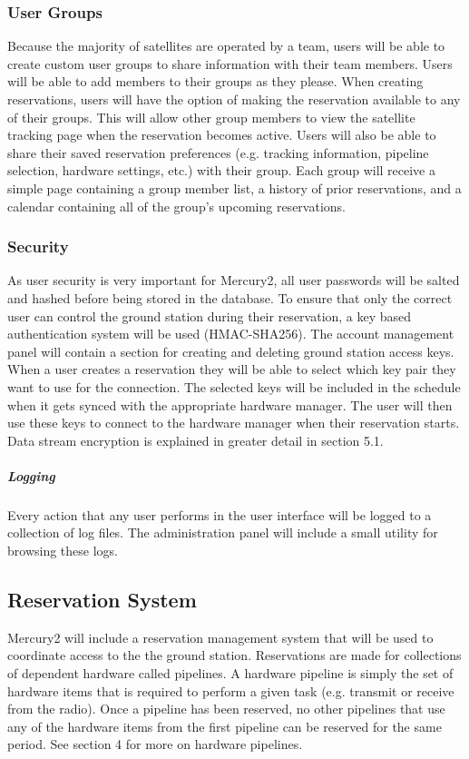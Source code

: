 \documentclass{mxl-design}
\begin{document}
\subsubsection{User Groups}
Because the majority of satellites are operated by a team, users will be able to create custom user groups to share information with their team members. Users will be able to add members to their groups as they please. When creating reservations, users will have the option of making the reservation available to any of their groups. This will allow other group members to view the satellite tracking page when the reservation becomes active. Users will also be able to share their saved reservation preferences (e.g. tracking information, pipeline selection, hardware settings, etc.) with their group. Each group will receive a simple page containing a group member list, a history of prior reservations, and a calendar containing all of the group's upcoming reservations.

\subsubsection{Security}
As user security is very important for Mercury2, all user passwords will be salted and hashed before being stored in the database. To ensure that only the correct user can control the ground station during their reservation, a key based authentication system will be used (HMAC-SHA256). The account management panel will contain a section for creating and deleting ground station access keys. When a user creates a reservation they will be able to select which key pair they want to use for the connection. The selected keys will be included in the schedule when it gets synced with the appropriate hardware manager. The user will then use these keys to connect to the hardware manager when their reservation starts. Data stream encryption is explained in greater detail in section 5.1.

\subparagraph{Logging}
Every action that any user performs in the user interface will be logged to a collection of log files. The administration panel will include a small utility for browsing these logs. 

\subsection{Reservation System}
Mercury2 will include a reservation management system that will be used to coordinate access to the the ground station. Reservations are made for collections of dependent hardware called pipelines. A hardware pipeline is simply the set of hardware items that is required to perform a given task (e.g. transmit or receive from the radio). Once a pipeline has been reserved, no other pipelines that use any of the hardware items from the first pipeline can be reserved for the same period. See section 4 for more on hardware pipelines.
\end{document}
